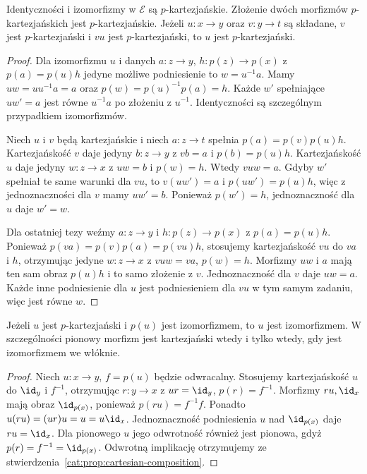 \begin{stwierdzenie}\label{cat:prop:cartesian-composition}
Identyczności i izomorfizmy w $\mathcal E$ są $p$-kartezjańskie. Złożenie dwóch morfizmów $p$-kartezjańskich jest $p$-kartezjańskie. Jeżeli $u:x\to y$ oraz $v:y\to t$ są składane, $v$ jest $p$-kartezjański i $vu$ jest $p$-kartezjański, to $u$ jest $p$-kartezjański.
\end{stwierdzenie}
\begin{proof}
Dla izomorfizmu $u$ i danych $a:z\to y$, $h:p(z)\to p(x)$ z $p(a)=p(u)h$ jedyne możliwe podniesienie to $w=u^{-1}a$. Mamy $uw=uu^{-1}a=a$ oraz $p(w)=p(u)^{-1}p(a)=h$. Każde $w'$ spełniające $uw'=a$ jest równe $u^{-1}a$ po złożeniu z $u^{-1}$. Identyczności są szczególnym przypadkiem izomorfizmów.

Niech $u$ i $v$ będą kartezjańskie i niech $a:z\to t$ spełnia $p(a)=p(v)p(u)h$. Kartezjańskość $v$ daje jedyny $b:z\to y$ z $vb=a$ i $p(b)=p(u)h$. Kartezjańskość $u$ daje jedyny $w:z\to x$ z $uw=b$ i $p(w)=h$. Wtedy $vuw=a$. Gdyby $w'$ spełniał te same warunki dla $vu$, to $v(uw')=a$ i $p(uw')=p(u)h$, więc z jednoznaczności dla $v$ mamy $uw'=b$. Ponieważ $p(w')=h$, jednoznaczność dla $u$ daje $w'=w$.

Dla ostatniej tezy weźmy $a:z\to y$ i $h:p(z)\to p(x)$ z $p(a)=p(u)h$. Ponieważ $p(va)=p(v)p(a)=p(vu)h$, stosujemy kartezjańskość $vu$ do $va$ i $h$, otrzymując jedyne $w:z\to x$ z $vuw=va$, $p(w)=h$. Morfizmy $uw$ i $a$ mają ten sam obraz $p(u)h$ i to samo złożenie z $v$. Jednoznaczność dla $v$ daje $uw=a$. Każde inne podniesienie dla $u$ jest podniesieniem dla $vu$ w tym samym zadaniu, więc jest równe $w$.
\end{proof}

\begin{stwierdzenie}\label{cat:prop:vertical-cartesian-iso}
Jeżeli $u$ jest $p$-kartezjański i $p(u)$ jest izomorfizmem, to $u$ jest izomorfizmem. W szczególności pionowy morfizm jest kartezjański wtedy i tylko wtedy, gdy jest izomorfizmem we włóknie.
\end{stwierdzenie}
\begin{proof}
Niech $u:x\to y$, $f=p(u)$ będzie odwracalny. Stosujemy kartezjańskość $u$ do $\id_y$ i $f^{-1}$, otrzymując $r:y\to x$ z $ur=\id_y$, $p(r)=f^{-1}$. Morfizmy $ru,\id_x$ mają obraz $\id_{p(x)}$, ponieważ $p(ru)=f^{-1}f$. Ponadto $u(ru)=(ur)u=u=u\id_x$. Jednoznaczność podniesienia $u$ nad $\id_{p(x)}$ daje $ru=\id_x$. Dla pionowego $u$ jego odwrotność również jest pionowa, gdyż $p(r)=f^{-1}=\id_{p(x)}$. Odwrotną implikację otrzymujemy ze stwierdzenia~\ref{cat:prop:cartesian-composition}.
\end{proof}

